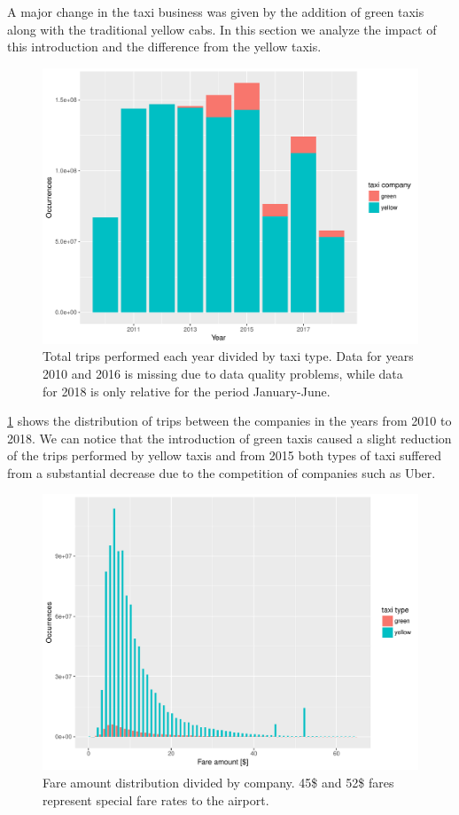 \documentclass{acm_proc_article-sp-sigmod09}
\begin{document}
A major change in the taxi business was given by the addition of green taxis along with the traditional yellow cabs. In this section we analyze the impact of this introduction and the difference from the yellow taxis.

\begin{figure}
	\centering
	\includegraphics[width=1\columnwidth]{resources/base_plots/travels_by_year_and_company.pdf}
	\caption{Total trips performed each year divided by taxi type. Data for years 2010 and 2016 is missing due to data quality problems, while data for 2018 is only relative for the period January-June.}
	\label{fig:travelsByYearAndCompany}
\end{figure}

\cref{fig:travelsByYearAndCompany} shows the distribution of trips between the companies in the years from 2010 to 2018. We can notice that the introduction of green taxis caused a slight reduction of the trips performed by yellow taxis and from 2015 both types of taxi suffered from a substantial decrease due to the competition of companies such as Uber.

\begin{figure}
	\centering
	\includegraphics[width=1\columnwidth]{resources/base_plots/fare_amount_by_company_distr.pdf}
	\caption{Fare amount distribution divided by company. 45\$ and 52\$ fares represent special fare rates to the airport.}
	\label{fig:fareAmountByCompany}
\end{figure}
\end{document}
